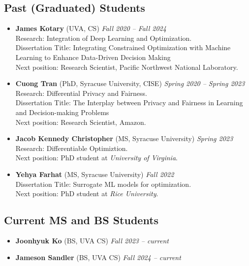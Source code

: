 \subsection*{Past (Graduated) Students}
\begin{itemize}
  \item \textbf{James Kotary} ({\sc UVA}, CS) 
  \hfill{\em Fall 2020 -- Fall 2024}\\
  {\sc Research}: Integration of Deep Learning and Optimization.\\
  {\sc Dissertation Title}: Integrating Constrained Optimization with Machine Learning to Enhance Data-Driven Decision Making\\
  {\sc Next position:} Research Scientist, Pacific Northwest National Laboratory.

  \item \textbf{Cuong Tran} ({\sc PhD, Syracuse University}, CISE) 
  \hfill{\em Spring 2020 -- Spring 2023}\\
  {\sc Research}: Differential Privacy and Fairness.\\
  {\sc Dissertation Title:} The Interplay between Privacy and Fairness in
  Learning and Decision-making Problems\\
  {\sc Next position:} Research Scientist, Amazon.

  \item \textbf{Jacob Kennedy Christopher} ({\sc MS, Syracuse University}) \hfill{\em Spring 2023}\\
  {\sc Research:} Differentiable Optimiztion.\\
  {\sc Next position:} PhD student at \textit{University of Virginia}.

  \item \textbf{Yehya Farhat} ({\sc MS, Syracuse University}) \hfill{\em Fall 2022}\\
  {\sc Dissertation Title:} Surrogate ML models for optimization.\\
  {\sc Next position:} PhD student at \textit{Rice University}.

\end{itemize}

\subsection*{Current MS and BS Students}
\begin{itemize}
  \item  \textbf{Joonhyuk Ko} ({\sc BS, UVA} CS)  \hfill{\em Fall 2023 -- current}
  \item  \textbf{Jameson Sandler} ({\sc BS, UVA} CS)  \hfill{\em Fall 2024 -- current}
\end{itemize}

